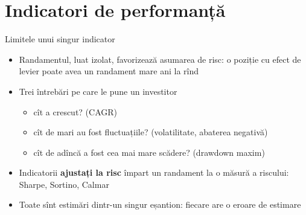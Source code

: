 \section{Indicatori de performanță}

\begin{frame}{Limitele unui singur indicator}
\itemsize{\small}
\begin{itemize}
    \item Randamentul, luat izolat, favorizează asumarea de risc: o poziție cu efect de levier poate avea un randament mare ani la rînd
    \item Trei întrebări pe care le pune un investitor
    \begin{itemize}
        \item cît a crescut? (CAGR)
        \item cît de mari au fost fluctuațiile? (volatilitate, abaterea negativă)
        \item cît de adîncă a fost cea mai mare scădere? (drawdown maxim)
    \end{itemize}
    \item Indicatorii \textbf{ajustați la risc} împart un randament la o măsură a riscului: Sharpe, Sortino, Calmar
    \item Toate sînt estimări dintr-un singur eșantion: fiecare are o eroare de estimare
\end{itemize}
\end{frame}

